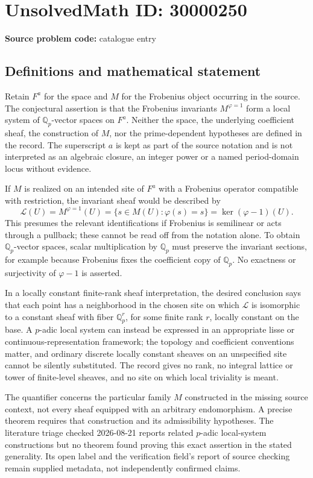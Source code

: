 \documentclass[11pt]{article}
\newcommand{\Q}{\mathbb{Q}}
\begin{document}
\section*{UnsolvedMath ID: 30000250}
\textbf{Source problem code:} catalogue entry
\subsection{Definitions and mathematical statement}
Retain \(F^a\) for the space and \(M\) for the Frobenius object occurring in the source. The conjectural assertion is that the Frobenius invariants \(M^{\varphi=1}\) form a local system of \(\Q_p\)-vector spaces on \(F^a\). Neither the space, the underlying coefficient sheaf, the construction of \(M\), nor the prime-dependent hypotheses are defined in the record. The superscript \(a\) is kept as part of the source notation and is not interpreted as an algebraic closure, an integer power or a named period-domain locus without evidence.

If \(M\) is realized on an intended site of \(F^a\) with a Frobenius operator compatible with restriction, the invariant sheaf would be described by
\[
 \mathcal L(U)=M^{\varphi=1}(U)
 =\{s\in M(U):\varphi(s)=s\}
 =\ker(\varphi-1)(U).
\]
This presumes the relevant identifications if Frobenius is semilinear or acts through a pullback; these cannot be read off from the notation alone. To obtain \(\Q_p\)-vector spaces, scalar multiplication by \(\Q_p\) must preserve the invariant sections, for example because Frobenius fixes the coefficient copy of \(\Q_p\). No exactness or surjectivity of \(\varphi-1\) is asserted.

In a locally constant finite-rank sheaf interpretation, the desired conclusion says that each point has a neighborhood in the chosen site on which \(\mathcal L\) is isomorphic to a constant sheaf with fiber \(\Q_p^r\), for some finite rank \(r\), locally constant on the base. A \(p\)-adic local system can instead be expressed in an appropriate lisse or continuous-representation framework; the topology and coefficient conventions matter, and ordinary discrete locally constant sheaves on an unspecified site cannot be silently substituted. The record gives no rank, no integral lattice or tower of finite-level sheaves, and no site on which local triviality is meant.

The quantifier concerns the particular family \(M\) constructed in the missing source context, not every sheaf equipped with an arbitrary endomorphism. A precise theorem requires that construction and its admissibility hypotheses. The literature triage checked 2026-08-21 reports related \(p\)-adic local-system constructions but no theorem found proving this exact assertion in the stated generality. Its open label and the verification field's report of source checking remain supplied metadata, not independently confirmed claims.
\end{document}
